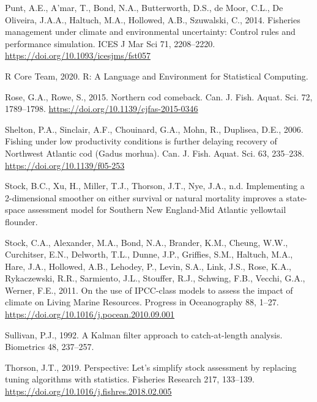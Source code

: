 \documentclass[]{article}
\begin{document}
\leavevmode\hypertarget{ref-punt2014Fisheries}{}%
Punt, A.E., A'mar, T., Bond, N.A., Butterworth, D.S., de Moor, C.L., De
Oliveira, J.A.A., Haltuch, M.A., Hollowed, A.B., Szuwalski, C., 2014.
Fisheries management under climate and environmental uncertainty:
Control rules and performance simulation. ICES J Mar Sci 71, 2208--2220.
\url{https://doi.org/10.1093/icesjms/fst057}

\leavevmode\hypertarget{ref-rcoreteam2020Language}{}%
R Core Team, 2020. R: A Language and Environment for Statistical
Computing.

\leavevmode\hypertarget{ref-rose2015Northern}{}%
Rose, G.A., Rowe, S., 2015. Northern cod comeback. Can. J. Fish. Aquat.
Sci. 72, 1789--1798. \url{https://doi.org/10.1139/cjfas-2015-0346}

\leavevmode\hypertarget{ref-shelton2006Fishing}{}%
Shelton, P.A., Sinclair, A.F., Chouinard, G.A., Mohn, R., Duplisea,
D.E., 2006. Fishing under low productivity conditions is further
delaying recovery of Northwest Atlantic cod (Gadus morhua). Can. J.
Fish. Aquat. Sci. 63, 235--238. \url{https://doi.org/10.1139/f05-253}

\leavevmode\hypertarget{ref-stockthisissueImplementing}{}%
Stock, B.C., Xu, H., Miller, T.J., Thorson, J.T., Nye, J.A., n.d.
Implementing a 2-dimensional smoother on either survival or natural
mortality improves a state-space assessment model for Southern New
England-Mid Atlantic yellowtail flounder.

\leavevmode\hypertarget{ref-stock2011Use}{}%
Stock, C.A., Alexander, M.A., Bond, N.A., Brander, K.M., Cheung, W.W.,
Curchitser, E.N., Delworth, T.L., Dunne, J.P., Griffies, S.M., Haltuch,
M.A., Hare, J.A., Hollowed, A.B., Lehodey, P., Levin, S.A., Link, J.S.,
Rose, K.A., Rykaczewski, R.R., Sarmiento, J.L., Stouffer, R.J., Schwing,
F.B., Vecchi, G.A., Werner, F.E., 2011. On the use of IPCC-class models
to assess the impact of climate on Living Marine Resources. Progress in
Oceanography 88, 1--27.
\url{https://doi.org/10.1016/j.pocean.2010.09.001}

\leavevmode\hypertarget{ref-sullivan1992Kalman}{}%
Sullivan, P.J., 1992. A Kalman filter approach to catch-at-length
analysis. Biometrics 48, 237--257.

\leavevmode\hypertarget{ref-thorson2019Perspective}{}%
Thorson, J.T., 2019. Perspective: Let's simplify stock assessment by
replacing tuning algorithms with statistics. Fisheries Research 217,
133--139. \url{https://doi.org/10.1016/j.fishres.2018.02.005}
\end{document}
